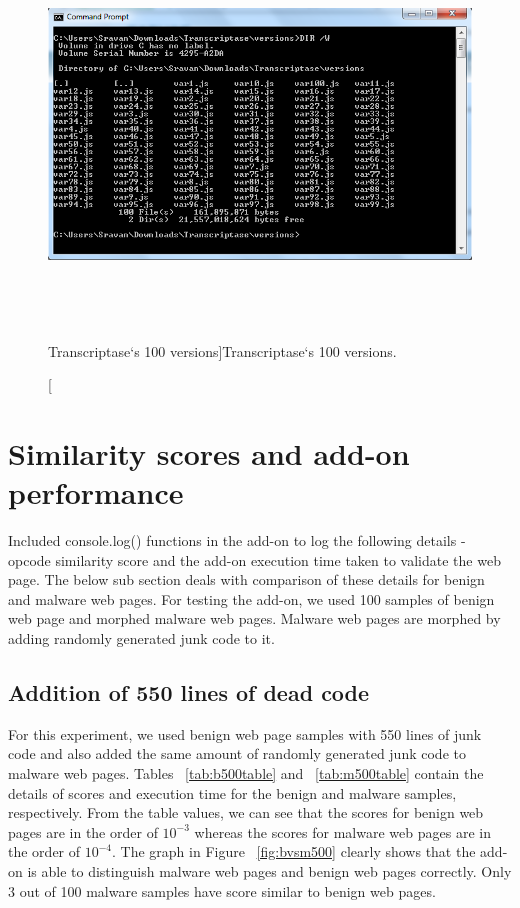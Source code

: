 \begin{figure}[h]
  \centering
      \includegraphics[width=16.875cm, height=10cm]{Capture.PNG}
    \caption[Transcriptase`s 100 versions]{Transcriptase`s 100 versions.}
    \label{fig:100versions}
\end{figure}

\section{Similarity scores and add-on performance}
Included console.log() functions in the add-on to log the following details - opcode similarity score and the add-on execution time taken to validate the web page. The below sub section deals with comparison of these details for benign and malware web pages. For testing the add-on, we used 100 samples of benign web page and morphed malware web pages. Malware web pages are morphed by adding randomly generated junk code to it.
\subsection{Addition of 550 lines of dead code}
For this experiment, we used benign web page samples with 550 lines of junk code and also added the same amount of randomly generated junk code to malware web pages. Tables ~\ref{tab:b500table} and  ~\ref{tab:m500table} contain the details of scores and execution time for the benign and malware samples, respectively. From the table values, we can see that the scores for benign web pages are in the order of $10^{-3}$ whereas the scores for malware web pages are in the order of $10^{-4}$. The graph in Figure ~\ref{fig:bvsm500} clearly shows that the add-on is able to distinguish malware web pages and benign web pages correctly. Only 3 out of 100 malware samples have score similar to benign web pages.
    

